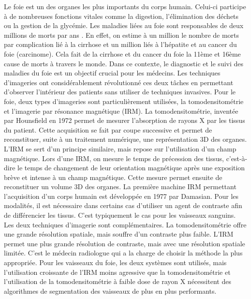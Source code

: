 Le foie est un des organes les plus importants du corps humain. Celui-ci participe à de nombreuses fonctions vitales comme la digestion, l'élimination des déchets ou la gestion de la glycémie. Les maladies liées au foie sont responsables de deux millions de morts par ans \cite{Asrani2019_liver_deseases}. En effet, on estime à un million le nombre de morts par complication lié à la cirrhose et un million liés à l'hépatite et au cancer du foie (carcinome). Cela fait de la cirrhose et du cancer du foie la 11ème et 16ème cause de morts à travers le monde.
Dans ce contexte, le diagnostic et le suivi des maladies du foie est un objectif crucial pour les médecins. Les techniques d'imageries ont considérablement révolutionné ces deux tâches en permettant d'observer l'intérieur des patients sans utiliser de techniques invasives. Pour le foie, deux types d'imageries sont particulièrement utilisées, la tomodensitométrie et l'imagerie par résonance magnétique (IRM). La tomodensitométrie, inventée par Hounsfield en 1972 permet de mesurer l'absorption de rayons X par les tissus du patient. Cette acquisition se fait par coupe successive et permet de reconstituer, suite à un traitement numérique, une représentation 3D des organes. L'IRM se sert d'un principe similaire, mais repose sur l'utilisation d'un champ magnétique. Lors d'une IRM, on mesure le temps de précession des tissus, c'est-à-dire le temps de changement de leur orientation magnétique après une exposition brève et intense à un champ magnétique. Cette mesure permet ensuite de reconstituer un volume 3D des organes. La première machine IRM permettant l'acquisition d'un corps humain est développée en 1977 par Damasian. Pour les modalités, il est nécessaire dans certains cas d'utiliser un agent de contraste afin de différencier les tissus. C'est typiquement le cas pour les vaisseaux sanguins.
Les deux techniques d'imagerie sont complémentaires. La tomodensitométrie offre une grande résolution spatiale, mais souffre d'un contraste plus faible. L'IRM permet une plus grande résolution de contraste, mais avec une résolution spatiale limitée. C'est le médecin radiologue qui a la charge de choisir la méthode la plus appropriée. Pour les vaisseaux du foie, les deux systèmes sont utilisés, mais l'utilisation croissante de l'IRM moins agressive que la tomodensitométrie et l'utilisation de la tomodensitométrie à faible dose de rayon X nécessitent des algorithmes de segmentation des vaisseaux de plus en plus performants.

